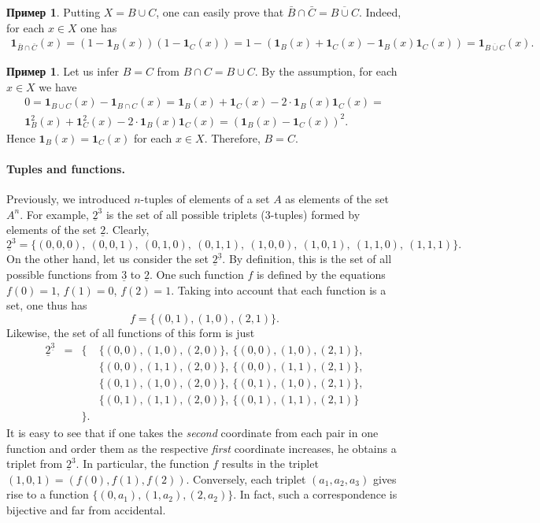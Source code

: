 \documentclass[12pt,notitlepage]{article}
\theoremstyle{plain}
\theoremstyle{definition}
\newtheorem{exm}[thm]{Пример}
\theoremstyle{plain}
\newcommand{\ul}[1]{\underline{#1}}
\newcommand{\1}{\mathbf{1}}
\newcommand{\0}{\mathbf{0}}
\begin{document}
\begin{exm} Putting $X = B \cup C$, one can easily prove that $\bar B \cap \bar C = \overline{B \cup C}$.  Indeed, for each $x \in X$ one has
	\begin{multline*}
		\1_{\bar B \cap \bar C}(x) = (1 - \1_B(x))(1 - \1_C(x)) =
		1 - (\1_B(x) + \1_C(x) - \1_B(x) \1_C(x)) = \1_{\overline{B \cup C}}(x).
	\end{multline*}
\end{exm}

\begin{exm}
	Let us infer $B = C$ from $B \cap C = B \cup C$. By the assumption, for each $x \in X$ we have
	\begin{multline*}
		0 = \1_{B \cup C}(x) - \1_{B \cap C}(x) = \1_B(x) + \1_C(x) - 2\cdot\1_B(x)\1_C(x) =\\
		\1^2_B(x) + \1^2_C(x) - 2\cdot\1_B(x)\1_C(x) = (\1_B(x) - \1_C(x))^2.
	\end{multline*}
	Hence $\1_B(x) = \1_C(x)$ for each $x \in X$. Therefore, $B = C$.
\end{exm}

\paragraph{Tuples and functions.} Previously, we introduced $n$-tuples of elements of a set $A$ as elements of the set $A^n$. For example, $\ul{2}^{3}$ is the set of all possible triplets ($3$-tuples) formed by elements of the set $\ul{2}$. Clearly,
$$
\ul{2}^3 = \{(0,0,0),\ (0,0,1),\ (0, 1, 0),\ (0, 1, 1),\ (1,0,0),\ (1,0,1),\ (1, 1, 0),\ (1, 1, 1)\}.
$$
On the other hand, let us consider the set $\ul{2}^{\ul{3}}$. By definition, this is the set of all possible functions from $\ul{3}$ to $\ul{2}$. One such function $f$ is defined by the equations $f(0) = 1$, $f(1) = 0$, $f(2) = 1$. Taking into account that each function is a set, one thus has
$$f = \{ (0,1), (1,0), (2,1) \}.$$
Likewise, the set of all functions of this form is just
$$
\begin{array}{rcll}
	\ul{2}^{\ul{3}} &=& \{& \{(0,0), (1,0), (2,0)\},\ \{(0,0), (1,0), (2,1)\},\\
	&&& \{(0,0), (1,1), (2,0)\},\ \{(0,0), (1,1), (2,1)\},\\
	&&& \{(0,1), (1,0), (2,0)\},\ \{(0,1), (1,0), (2,1)\},\\
	&&& \{(0,1), (1,1), (2,0)\},\ \{(0,1), (1,1), (2,1)\}\\
	&& \}. &
\end{array}
$$
It is easy to see that if one takes the \emph{second} coordinate from each pair in one function and order them as the respective \emph{first} coordinate increases, he obtains a triplet from $\ul{2}^3$. In particular, the function $f$ results in the triplet $(1, 0, 1) = (f(0), f(1), f(2))$. Conversely, each triplet $(a_1, a_2, a_3)$ gives rise to a function $\{(0,a_1), (1, a_2), (2, a_2)\}$. In fact, such a correspondence is bijective and far from accidental.
\end{document}
